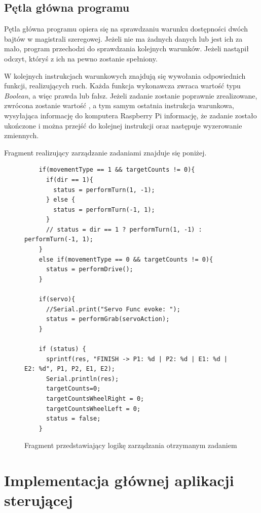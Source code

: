 \subsection{Pętla główna programu}

Pętla główna programu opiera się na sprawdzaniu warunku dostępności dwóch bajtów w magistrali szeregowej. Jeżeli nie ma żadnych danych lub jest ich za mało, program przechodzi do sprawdzania kolejnych warunków. Jeżeli nastąpił odczyt, któryś z ich na pewno zostanie spełniony. 

W kolejnych instrukcjach warunkowych znajdują się wywołania odpowiednich funkcji, realizujących ruch. Każda funkcja wykonawcza zwraca wartość typu \textit{Boolean}, a więc prawda lub fałsz. Jeżeli zadanie zostanie poprawnie zrealizowane, zwrócona zostanie wartość , a tym samym ostatnia instrukcja warunkowa, wysyłająca informację do komputera Raspberry Pi informację, że zadanie zostało ukończone i można przejść do kolejnej instrukcji oraz następuje wyzerowanie zmiennych. 

Fragment realizujący zarządzanie zadaniami znajduje się poniżej. 

\begin{figure}[H]
  \centering
  \begin{lstlisting}
    if(movementType == 1 && targetCounts != 0){
      if(dir == 1){
        status = performTurn(1, -1);
      } else {
        status = performTurn(-1, 1);
      }
      // status = dir == 1 ? performTurn(1, -1) : performTurn(-1, 1);
    }
    else if(movementType == 0 && targetCounts != 0){
      status = performDrive();
    }
    
    if(servo){
      //Serial.print("Servo Func evoke: ");
      status = performGrab(servoAction);
    }
  
    if (status) {
      sprintf(res, "FINISH -> P1: %d | P2: %d | E1: %d | E2: %d", P1, P2, E1, E2);
      Serial.println(res);
      targetCounts=0;
      targetCountsWheelRight = 0;
      targetCountsWheelLeft = 0;
      status = false;
    }
  \end{lstlisting}
  \caption{Fragment przedstawiający logikę zarządzania otrzymanym zadaniem}
  \label{fig:manage-ex}
\end{figure}

\clearpage

\section{Implementacja głównej aplikacji sterującej}

